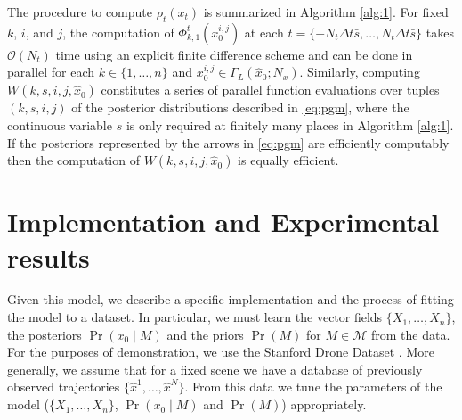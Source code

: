 \documentclass[letterpaper,10pt,conference]{ieeeconf}
\newtheorem{thm}{Theorem}
\begin{document}
The procedure to compute  $\rho_t(x_t)$ is summarized in Algorithm \ref{alg:1}.
For fixed $k$, $i$, and $j$, the computation of $\Phi_{k,1}^t(x_0^{i,j})$ at each $t = \{-N_t \Delta t \bar{s} ,\dots, N_t \Delta t \bar{s}\}$ takes $\mathcal{O}(N_t)$ time using an explicit finite difference scheme and can be done in parallel for each $k \in \{1,\dots, n\}$ and $x_0^{i,j} \in \Gamma_L( \hat{x}_0; N_x)$.
Similarly, computing $W(k,s,i,j,\hat{x}_0)$ constitutes a series of parallel function evaluations over tuples $(k,s,i,j)$ of the posterior distributions described in \eqref{eq:pgm}, where the continuous variable $s$ is only required at finitely many places in Algorithm \ref{alg:1}.
If the posteriors represented by the arrows in \eqref{eq:pgm} are efficiently computably then the computation of $W(k,s,i,j, \hat{x}_0)$ is equally efficient.
  
\section{Implementation and Experimental results} \label{sec:implementation}
  Given this model, we describe a specific implementation and the process of fitting the model to a dataset.
  In particular, we must learn the vector fields $\{X_1, \dots, X_n\}$, the posteriors $\Pr( x_0 \mid M)$ and the priors $\Pr(M)$ for $M \in \mathcal{M}$ from the data.
  For the purposes of demonstration, we use the Stanford Drone Dataset \cite{Robicquet2016}.
  More generally, we assume that for a fixed scene we have a database of previously observed trajectories $\{ \hat{x}^1, \dots, \hat{x}^N\}$.
  From this data we tune the parameters of the model ($\{X_1, \dots, X_n\}$, $\Pr( x_0 \mid M)$ and $\Pr(M)$)  appropriately.
  
\end{document}
